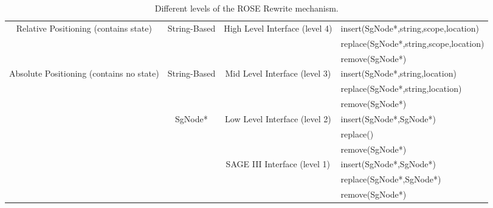 \begin{table}[htb]
{\begin{center}
    \renewcommand{\arraystretch}{1.25}

\begin{tabular}{|c|c|c|l|}
\hline
\multirow{3}{35mm}{Relative Positioning (contains state)} 
     & \multirow{3}{15mm}{String-Based} 
          & \multirow{3}{35mm}{High Level Interface (level 4)} 
               & {insert(SgNode*,string,scope,location)} \\
     & {} & {} & {replace(SgNode*,string,scope,location)} \\
     & {} & {} & {remove(SgNode*)} \\\hline
\multirow{9}{35mm}{Absolute Positioning (contains no state)} 
     & \multirow{3}{15mm}{String-Based} 
          & \multirow{3}{35mm}{Mid Level Interface (level 3)} 
          & {insert(SgNode*,string,location)} \\ 
     & {} & {} & {replace(SgNode*,string,location)} \\
     & {} & {} & {remove(SgNode*)} \\\cline{2-4}
     & \multirow{6}{15mm}{SgNode*} 
          & \multirow{3}{35mm}{Low Level Interface (level 2)} 
          & {insert(SgNode*,SgNode*)} \\ 
     & {} & {} & {replace()} \\
     & {} & {} & {remove(SgNode*)} \\\cline{3-4}
     & {} & \multirow{3}{35mm}{SAGE III Interface (level 1)} 
          & {insert(SgNode*,SgNode*)} \\ 
     & {} & {} & {replace(SgNode*,SgNode*)} \\ 
     & {} & {} & {remove(SgNode*)} \\\hline 
\end{tabular}

 \end{center}
}
  \caption{Different levels of the ROSE Rewrite mechanism.}
  \label{tab:RewriteInterface}
\end{table}

% 
% 

